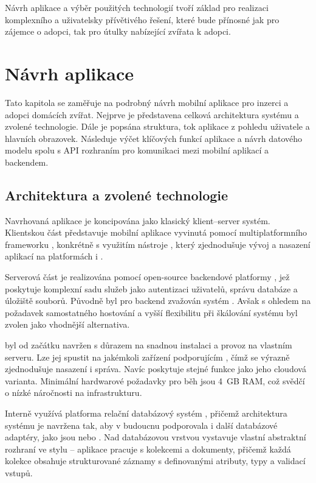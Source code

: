 \documentclass[czech, bp, kiv, he, iso690numb, pdf]{fasthesis}
\begin{document}
    Návrh aplikace a výběr použitých technologií tvoří základ pro realizaci komplexního a uživatelsky přívětivého řešení, které bude přínosné jak pro zájemce o adopci, tak pro útulky nabízející zvířata k adopci.




    \chapter{Návrh aplikace}

    Tato kapitola se zaměřuje na podrobný návrh mobilní aplikace pro inzerci a adopci domácích zvířat. Nejprve je představena celková architektura systému a zvolené technologie. Dále je popsána struktura, tok aplikace z pohledu uživatele a hlavních obrazovek. Následuje výčet klíčových funkcí aplikace a návrh datového modelu spolu s API rozhraním pro komunikaci mezi mobilní aplikací a backendem.

    \section{Architektura a zvolené technologie}

    Navrhovaná aplikace je koncipována jako klasický klient--server systém. Klientskou část představuje mobilní aplikace vyvinutá pomocí multiplatformního frameworku , konkrétně s využitím nástroje , který zjednodušuje vývoj a nasazení aplikací na platformách  i .

    Serverová část je realizována pomocí open-source backendové platformy , jež poskytuje komplexní sadu služeb jako autentizaci uživatelů, správu databáze a úložiště souborů. Původně byl pro backend zvažován systém . Avšak s ohledem na požadavek samostatného hostování a vyšší flexibilitu při škálování systému byl zvolen  jako vhodnější alternativa.

     byl od začátku navržen s důrazem na snadnou instalaci a provoz na vlastním serveru. Lze jej spustit na jakémkoli zařízení podporujícím , čímž se výrazně zjednodušuje nasazení i správa. Navíc poskytuje stejné funkce jako jeho cloudová varianta. Minimální hardwarové požadavky pro běh  jsou 4~GB RAM, což svědčí o nízké náročnosti na infrastrukturu\cite{appwrite-selfhosting}.

    Interně využívá platforma  relační databázový systém , přičemž architektura systému je navržena tak, aby v budoucnu podporovala i další databázové adaptéry, jako jsou  nebo . Nad databázovou vrstvou  vystavuje vlastní abstraktní rozhraní ve stylu  – aplikace pracuje s kolekcemi a dokumenty, přičemž každá kolekce obsahuje strukturované záznamy s definovanými atributy, typy a validací vstupů.
\end{document}
